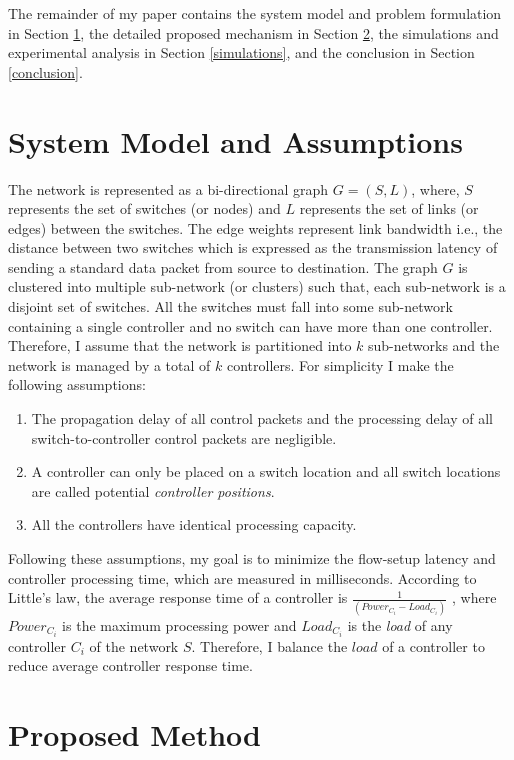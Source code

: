 \documentclass[preprint,12pt]{elsarticle}
\begin{document}
	The remainder of my paper contains the system model and problem formulation in Section \ref{sysMod}, the detailed proposed mechanism in Section \ref{proposal}, the simulations and experimental analysis in Section \ref{simulations}, and the conclusion in Section \ref{conclusion}.
	
	\section{System Model and Assumptions} \label{sysMod}
	The network is represented as a bi-directional graph $G=(S,L)$, where, $S$ represents the set of switches (or nodes) and $L$ represents the set of links (or edges) between the switches. The edge weights represent link bandwidth i.e., the distance between two switches which is expressed as the transmission latency of sending a standard data packet from source to destination. The graph $G$ is clustered into multiple sub-network (or clusters) such that, each sub-network is a disjoint set of switches. All the switches must fall into some sub-network containing a single controller and no switch can have more than one controller. Therefore, I assume that the network is partitioned into $k$ sub-networks and the network is managed by a total of $k$ controllers. For simplicity I make the following assumptions:
	\begin{enumerate}
		\item The propagation delay of all control packets and the processing delay of all switch-to-controller control packets are negligible.
		\item A controller can only be placed on a switch location and all switch locations are called potential \textit{controller positions}.
		\item All the controllers have identical processing capacity.
	\end{enumerate}
	Following these assumptions, my goal is to minimize the flow-setup latency and controller processing time, which are measured in milliseconds. According to Little's law, the average response time of a controller is $\frac{1}{(Power_{C_i} - Load_{C_i})}$ \cite{wang2016dynamic}, where $Power_{C_i}$ is the maximum processing power and $Load_{C_i}$ is the \textit{load} of any controller $C_i$ of the network $S$. Therefore, I balance the $load$ of a controller to reduce average controller response time.
	
	\section{Proposed Method} \label{proposal}
	
\end{document}
